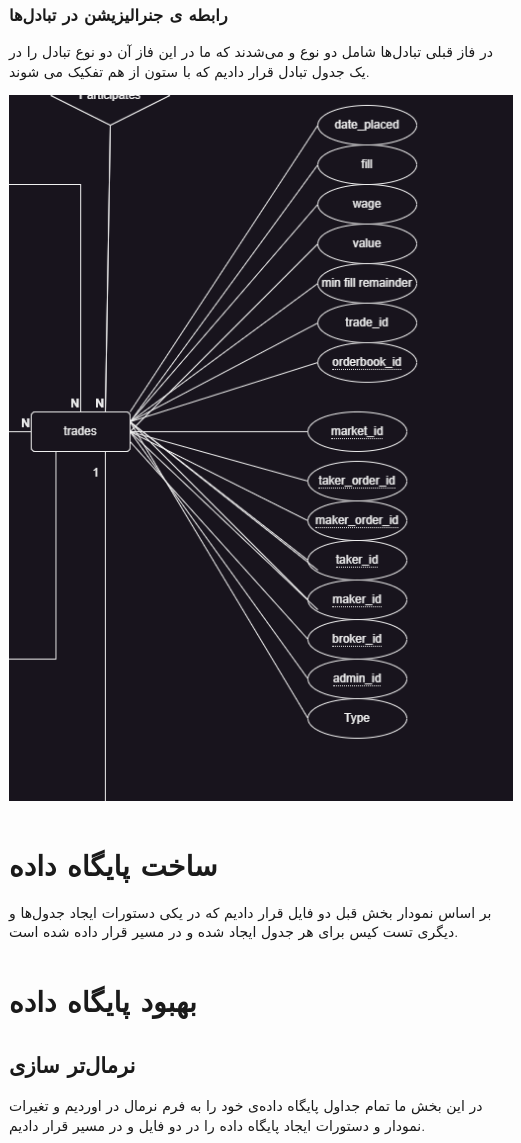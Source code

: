 \documentclass{book}
\begin{document}
\subsection{رابطه ‌ی جنرالیزیشن در تبادل‌ها}
در فاز قبلی تبادل‌ها شامل دو نوع  و  می‌شدند که ما در این فاز آن دو نوع تبادل را در یک جدول تبادل قرار دادیم که با ستون  از هم تفکیک می شوند.

\includegraphics[width=0.8\linewidth]{trades.png}
\newpage

\chapter{ساخت پایگاه داده}
بر اساس نمودار بخش قبل دو فایل  قرار دادیم که در یکی دستورات ایجاد جدول‌ها و دیگری تست کیس برای هر جدول ایجاد شده و در مسیر  قرار داده شده است.

\chapter{بهبود پایگاه داده}
\section{نرمال‌تر سازی}
در این بخش ما تمام جداول پایگاه داده‌ی خود را به فرم نرمال در اوردیم و تغیرات نمودار و دستورات ایجاد پایگاه داده را در دو فایل  و  در مسیر  قرار دادیم.
\end{document}
